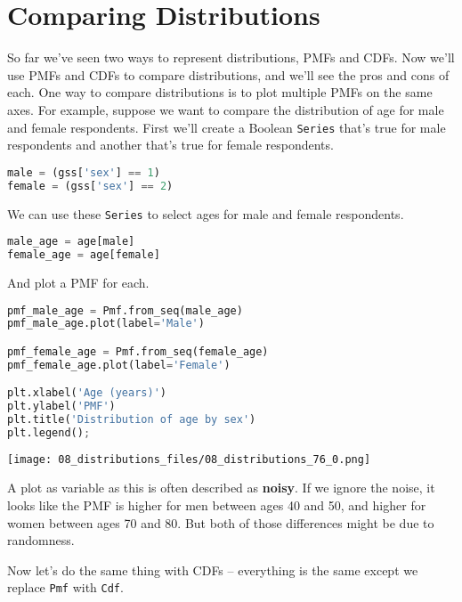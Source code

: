 \section{Comparing Distributions}\label{comparing-distributions}

So far we've seen two ways to represent distributions, PMFs and CDFs.
Now we'll use PMFs and CDFs to compare distributions, and we'll see the
pros and cons of each. One way to compare distributions is to plot
multiple PMFs on the same axes. For example, suppose we want to compare
the distribution of age for male and female respondents. First we'll
create a Boolean \passthrough{\lstinline!Series!} that's true for male
respondents and another that's true for female respondents.

\begin{lstlisting}[language=Python,style=source]
male = (gss['sex'] == 1)
female = (gss['sex'] == 2)
\end{lstlisting}

We can use these \passthrough{\lstinline!Series!} to select ages for
male and female respondents.

\begin{lstlisting}[language=Python,style=source]
male_age = age[male]
female_age = age[female]
\end{lstlisting}

And plot a PMF for each.

\begin{lstlisting}[language=Python,style=source]
pmf_male_age = Pmf.from_seq(male_age)
pmf_male_age.plot(label='Male')

pmf_female_age = Pmf.from_seq(female_age)
pmf_female_age.plot(label='Female')

plt.xlabel('Age (years)')
plt.ylabel('PMF')
plt.title('Distribution of age by sex')
plt.legend();
\end{lstlisting}

\begin{center}
\texttt{[image: 08\_distributions\_files/08\_distributions\_76\_0.png]}
\end{center}

A plot as variable as this is often described as \textbf{noisy}. If we
ignore the noise, it looks like the PMF is higher for men between ages
40 and 50, and higher for women between ages 70 and 80. But both of
those differences might be due to randomness.

Now let's do the same thing with CDFs -- everything is the same except
we replace \passthrough{\lstinline!Pmf!} with
\passthrough{\lstinline!Cdf!}.

